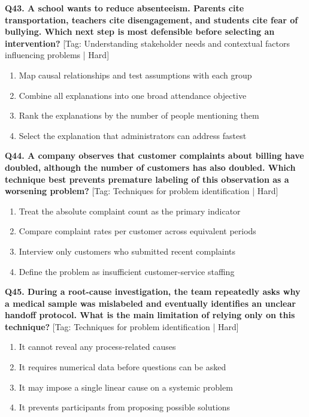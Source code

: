 \noindent\textbf{Q43. A school wants to reduce absenteeism. Parents cite transportation, teachers cite disengagement, and students cite fear of bullying. Which next step is most defensible before selecting an intervention?} \hfill [Tag: Understanding stakeholder needs and contextual factors influencing problems | Hard]
\begin{enumerate}[label=(\alph*),topsep=2pt,itemsep=1pt,partopsep=0pt,parsep=0pt]
    \item {Map causal relationships and test assumptions with each group}
    \item {Combine all explanations into one broad attendance objective}
    \item {Rank the explanations by the number of people mentioning them}
    \item {Select the explanation that administrators can address fastest}
\end{enumerate}
\vspace{2mm}

\noindent\textbf{Q44. A company observes that customer complaints about billing have doubled, although the number of customers has also doubled. Which technique best prevents premature labeling of this observation as a worsening problem?} \hfill [Tag: Techniques for problem identification | Hard]
\begin{enumerate}[label=(\alph*),topsep=2pt,itemsep=1pt,partopsep=0pt,parsep=0pt]
    \item {Treat the absolute complaint count as the primary indicator}
    \item {Compare complaint rates per customer across equivalent periods}
    \item {Interview only customers who submitted recent complaints}
    \item {Define the problem as insufficient customer-service staffing}
\end{enumerate}
\vspace{2mm}

\noindent\textbf{Q45. During a root-cause investigation, the team repeatedly asks why a medical sample was mislabeled and eventually identifies an unclear handoff protocol. What is the main limitation of relying only on this technique?} \hfill [Tag: Techniques for problem identification | Hard]
\begin{enumerate}[label=(\alph*),topsep=2pt,itemsep=1pt,partopsep=0pt,parsep=0pt]
    \item {It cannot reveal any process-related causes}
    \item {It requires numerical data before questions can be asked}
    \item {It may impose a single linear cause on a systemic problem}
    \item {It prevents participants from proposing possible solutions}
\end{enumerate}
\vspace{2mm}

